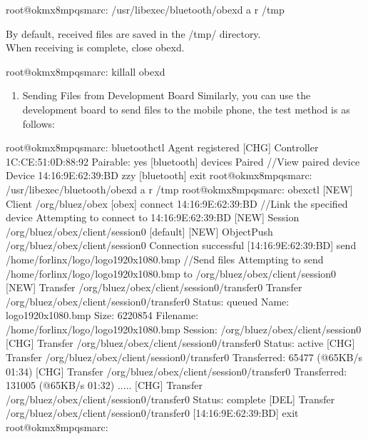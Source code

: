 \documentclass[letterpaper,10pt,openany,english]{sphinxmanual}
\begin{document}
\begin{sphinxVerbatim}[commandchars=\\\{\}]
root@ok\PYGZhy{}mx8mpq\PYGZhy{}smarc:\PYGZti{}\PYGZsh{} /usr/libexec/bluetooth/obexd \PYGZhy{}a \PYGZhy{}r /tmp \PYGZam{}
\end{sphinxVerbatim}

\sphinxAtStartPar
By default, received files are saved in the /tmp/ directory.\\
When receiving is complete, close obexd.

\begin{sphinxVerbatim}[commandchars=\\\{\}]
root@ok\PYGZhy{}mx8mpq\PYGZhy{}smarc:\PYGZti{}\PYGZsh{} killall obexd
\end{sphinxVerbatim}
\begin{enumerate}
%
\setcounter{enumi}{4}
\item {} 
\sphinxAtStartPar
Sending Files from Development Board Similarly, you can use the development board to send files to the mobile phone, the test method is as follows:

\end{enumerate}

\begin{sphinxVerbatim}[commandchars=\\\{\}]
root@ok\PYGZhy{}mx8mpq\PYGZhy{}smarc:\PYGZti{}\PYGZsh{} bluetoothctl 
Agent registered
[CHG] Controller 1C:CE:51:0D:88:92 Pairable: yes
[bluetooth]\PYGZsh{} devices  Paired        //View paired device
Device 14:16:9E:62:39:BD zzy
[bluetooth]\PYGZsh{} exit
root@ok\PYGZhy{}mx8mpq\PYGZhy{}smarc:\PYGZti{}\PYGZsh{} /usr/libexec/bluetooth/obexd \PYGZhy{}a \PYGZhy{}r /tmp \PYGZam{}
root@ok\PYGZhy{}mx8mpq\PYGZhy{}smarc:\PYGZti{}\PYGZsh{} obexctl 
[NEW] Client /org/bluez/obex 
[obex]\PYGZsh{} connect   14:16:9E:62:39:BD     //Link the specified device
Attempting to connect to 14:16:9E:62:39:BD
[NEW] Session /org/bluez/obex/client/session0 [default]
[NEW] ObjectPush /org/bluez/obex/client/session0 
Connection successful
[14:16:9E:62:39:BD]\PYGZsh{} send /home/forlinx/logo/logo\PYGZhy{}1920x1080.bmp  //Send files
Attempting to send /home/forlinx/logo/logo\PYGZhy{}1920x1080.bmp to /org/bluez/obex/client/session0
[NEW] Transfer /org/bluez/obex/client/session0/transfer0
Transfer /org/bluez/obex/client/session0/transfer0
        Status: queued
        Name: logo\PYGZhy{}1920x1080.bmp
        Size: 6220854
        Filename: /home/forlinx/logo/logo\PYGZhy{}1920x1080.bmp
        Session: /org/bluez/obex/client/session0
[CHG] Transfer /org/bluez/obex/client/session0/transfer0 Status: active
[CHG] Transfer /org/bluez/obex/client/session0/transfer0 Transferred: 65477 (@65KB/s 01:34)
[CHG] Transfer /org/bluez/obex/client/session0/transfer0 Transferred: 131005 (@65KB/s 01:32)
.....
[CHG] Transfer /org/bluez/obex/client/session0/transfer0 Status: complete
[DEL] Transfer /org/bluez/obex/client/session0/transfer0
[14:16:9E:62:39:BD]\PYGZsh{} exit
root@ok\PYGZhy{}mx8mpq\PYGZhy{}smarc:\PYGZti{}\PYGZsh{}
\end{sphinxVerbatim}
\end{document}
